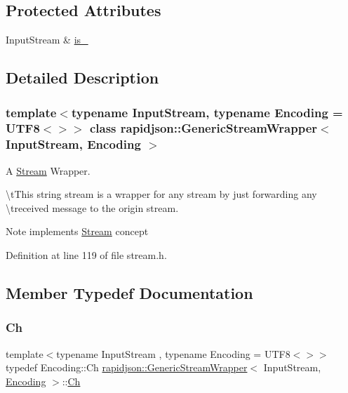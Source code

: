 \subsection*{Protected Attributes}
\begin{DoxyCompactItemize}
\item 
Input\+Stream \& \mbox{\hyperlink{classrapidjson_1_1_generic_stream_wrapper_a5cf3034d6761716e9ca2fe7591ed8274}{is\+\_\+}}
\end{DoxyCompactItemize}


\subsection{Detailed Description}
\subsubsection*{template$<$typename Input\+Stream, typename Encoding = U\+T\+F8$<$$>$$>$\newline
class rapidjson\+::\+Generic\+Stream\+Wrapper$<$ Input\+Stream, Encoding $>$}

A \mbox{\hyperlink{classrapidjson_1_1_stream}{Stream}} Wrapper. 

\textbackslash{}t\+This string stream is a wrapper for any stream by just forwarding any \textbackslash{}treceived message to the origin stream. \begin{DoxyNote}{Note}
implements \mbox{\hyperlink{classrapidjson_1_1_stream}{Stream}} concept 
\end{DoxyNote}


Definition at line 119 of file stream.\+h.



\subsection{Member Typedef Documentation}
\mbox{\label{classrapidjson_1_1_generic_stream_wrapper_ac07ed61df8db2bd4a5e713e613b06bdb}} 
\subsubsection{\texorpdfstring{Ch}{Ch}}
{\footnotesize\ttfamily template$<$typename Input\+Stream , typename Encoding  = U\+T\+F8$<$$>$$>$ \\
typedef Encoding\+::\+Ch \mbox{\hyperlink{classrapidjson_1_1_generic_stream_wrapper}{rapidjson\+::\+Generic\+Stream\+Wrapper}}$<$ Input\+Stream, \mbox{\hyperlink{classrapidjson_1_1_encoding}{Encoding}} $>$\+::\mbox{\hyperlink{classrapidjson_1_1_generic_stream_wrapper_ac07ed61df8db2bd4a5e713e613b06bdb}{Ch}}}



